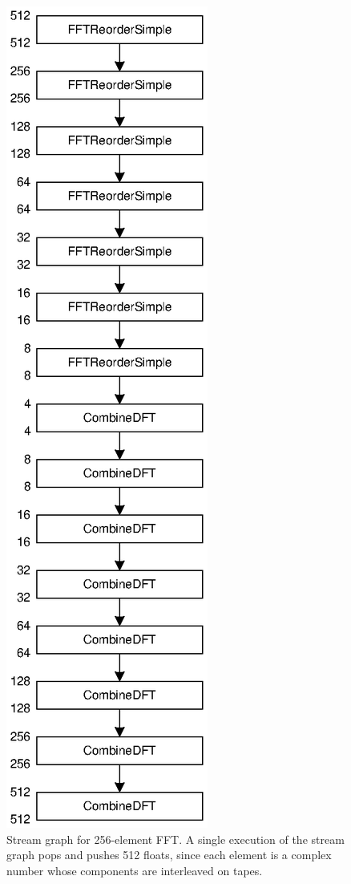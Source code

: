 \begin{figure}[!htb]
\begin{center}
\includegraphics{figs/fftgraph}
\end{center}
\caption[Stream graph for 256-element FFT.]{Stream graph for 256-element FFT. A single execution of the stream graph pops and pushes 512 floats, since each element is a complex number whose components are interleaved on tapes.}
\label{fig:use:fftgraph}
\end{figure}

